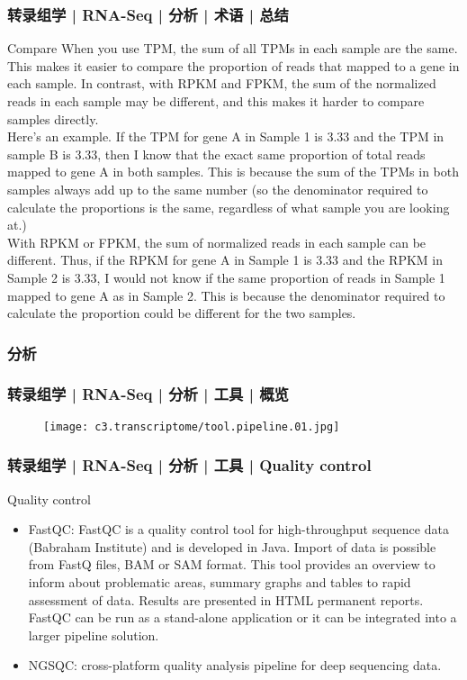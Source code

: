 \begin{frame}
  \frametitle{转录组学 | RNA-Seq | 分析 | 术语 | 总结}
  {\footnotesize
  \begin{block}{Compare}
    When you use TPM, the sum of all TPMs in each sample are the same. This makes it easier to compare the proportion of reads that mapped to a gene in each sample. In contrast, with RPKM and FPKM, the sum of the normalized reads in each sample may be different, and this makes it harder to compare samples directly.\\
    \vspace{0.5em}
    Here's an example. If the TPM for gene A in Sample 1 is 3.33 and the TPM in sample B is 3.33, then I know that the exact same proportion of total reads mapped to gene A in both samples. This is because the sum of the TPMs in both samples always add up to the same number (so the denominator required to calculate the proportions is the same, regardless of what sample you are looking at.)\\
    \vspace{0.5em}
    With RPKM or FPKM, the sum of normalized reads in each sample can be different. Thus, if the RPKM for gene A in Sample 1 is 3.33 and the RPKM in Sample 2 is 3.33, I would not know if the same proportion of reads in Sample 1 mapped to gene A as in Sample 2. This is because the denominator required to calculate the proportion could be different for the two samples.
  \end{block}
  }
\end{frame}

\subsubsection{分析}
\begin{frame}
  \frametitle{转录组学 | RNA-Seq | 分析 | 工具 | 概览}
  \begin{figure}
    \centering
    \texttt{[image: c3.transcriptome/tool.pipeline.01.jpg]}
  \end{figure}
\end{frame}

\begin{frame}
  \frametitle{转录组学 | RNA-Seq | 分析 | 工具 | Quality control}
  \begin{block}{Quality control}
    \begin{itemize}
      \item FastQC: FastQC is a quality control tool for high-throughput sequence data (Babraham Institute) and is developed in Java. Import of data is possible from FastQ files, BAM or SAM format. This tool provides an overview to inform about problematic areas, summary graphs and tables to rapid assessment of data. Results are presented in HTML permanent reports. FastQC can be run as a stand-alone application or it can be integrated into a larger pipeline solution.
      \item NGSQC: cross-platform quality analysis pipeline for deep sequencing data.
    \end{itemize}
  \end{block}
\end{frame}

